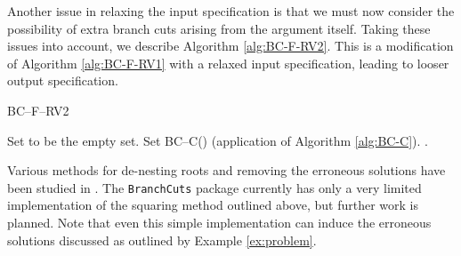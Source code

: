 \documentclass{llncs}
\begin{document}
Another issue in relaxing the input specification is that we must now consider the possibility of extra branch cuts arising from the argument itself.  Taking these issues into account, we describe Algorithm \ref{alg:BC-F-RV2}.  This is a modification of Algorithm \ref{alg:BC-F-RV1} with a relaxed input specification, leading to looser output specification.  

\begin{algorithm}[ht] \caption{BC--F--RV2} \label{alg:BC-F-RV2}
\DontPrintSemicolon
{}
\BlankLine
{}
{Set  to be the empty set. \;}
Set BC--C() (application of Algorithm \ref{alg:BC-C}). \;
\Return .
\end{algorithm}

Various methods for de-nesting roots and removing the erroneous solutions have been studied in
\cite{BBDP04, BPB05, BBDP07, Phisanbut11}.  
The \texttt{BranchCuts} package currently has only a very limited implementation of the squaring method outlined above, but further work is planned.  Note that even this simple implementation can induce the erroneous solutions discussed as outlined by Example \ref{ex:problem}.
\end{document}
